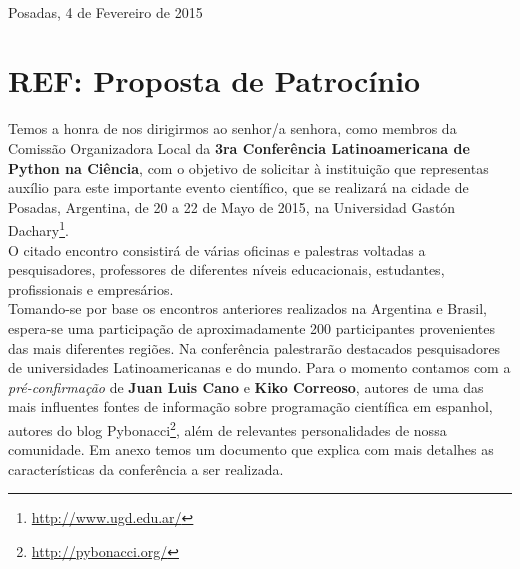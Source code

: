 \documentclass[11pt,a4paper]{report}
\begin{document}
\begin{center}
\end{center}



\hfill \\ Posadas, 4 de Fevereiro de 2015\\[0.1cm]

\section*{REF: Proposta de Patrocínio}

Temos a honra de nos dirigirmos ao senhor/a senhora, como membros da Comissão Organizadora Local da
\textbf{3ra Conferência Latinoamericana de Python na Ciência}, com o objetivo de solicitar
à instituição que representas auxílio para este importante evento científico, que se realizará na cidade
de Posadas, Argentina, de 20 a 22 de Mayo de 2015, na Universidad Gastón Dachary\footnote{\url{http://www.ugd.edu.ar/}}. \\[0.1cm]

O citado encontro consistirá de várias oficinas e palestras voltadas a
pesquisadores, professores de diferentes níveis educacionais,
estudantes, profissionais e empresários. \\[0.1cm]

Tomando-se por base os encontros anteriores realizados na Argentina e
Brasil, espera-se uma participação de aproximadamente 200 participantes
provenientes das mais diferentes regiões. Na conferência
palestrarão destacados pesquisadores de universidades Latinoamericanas e
do mundo. Para o momento contamos com a \emph{pré-confirmação} de
\textbf{Juan Luis Cano} e \textbf{Kiko Correoso}, autores de uma das
mais influentes fontes de informação sobre programação científica em espanhol,
autores do blog Pybonacci\footnote{\url{http://pybonacci.org/}}, além
de relevantes personalidades de nossa comunidade. Em anexo temos um documento
que explica com mais detalhes as características da
conferência a ser realizada.\\[0.1cm]
\end{document}
